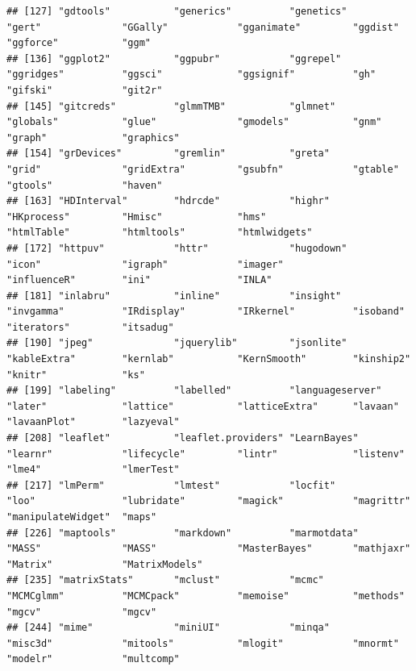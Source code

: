 \documentclass[
  12pt,
]{book}
\begin{document}
\begin{verbatim}
## [127] "gdtools"           "generics"          "genetics"          "gert"              "GGally"            "gganimate"         "ggdist"            "ggforce"           "ggm"              
## [136] "ggplot2"           "ggpubr"            "ggrepel"           "ggridges"          "ggsci"             "ggsignif"          "gh"                "gifski"            "git2r"            
## [145] "gitcreds"          "glmmTMB"           "glmnet"            "globals"           "glue"              "gmodels"           "gnm"               "graph"             "graphics"         
## [154] "grDevices"         "gremlin"           "greta"             "grid"              "gridExtra"         "gsubfn"            "gtable"            "gtools"            "haven"            
## [163] "HDInterval"        "hdrcde"            "highr"             "HKprocess"         "Hmisc"             "hms"               "htmlTable"         "htmltools"         "htmlwidgets"      
## [172] "httpuv"            "httr"              "hugodown"          "icon"              "igraph"            "imager"            "influenceR"        "ini"               "INLA"             
## [181] "inlabru"           "inline"            "insight"           "invgamma"          "IRdisplay"         "IRkernel"          "isoband"           "iterators"         "itsadug"          
## [190] "jpeg"              "jquerylib"         "jsonlite"          "kableExtra"        "kernlab"           "KernSmooth"        "kinship2"          "knitr"             "ks"               
## [199] "labeling"          "labelled"          "languageserver"    "later"             "lattice"           "latticeExtra"      "lavaan"            "lavaanPlot"        "lazyeval"         
## [208] "leaflet"           "leaflet.providers" "LearnBayes"        "learnr"            "lifecycle"         "lintr"             "listenv"           "lme4"              "lmerTest"         
## [217] "lmPerm"            "lmtest"            "locfit"            "loo"               "lubridate"         "magick"            "magrittr"          "manipulateWidget"  "maps"             
## [226] "maptools"          "markdown"          "marmotdata"        "MASS"              "MASS"              "MasterBayes"       "mathjaxr"          "Matrix"            "MatrixModels"     
## [235] "matrixStats"       "mclust"            "mcmc"              "MCMCglmm"          "MCMCpack"          "memoise"           "methods"           "mgcv"              "mgcv"             
## [244] "mime"              "miniUI"            "minqa"             "misc3d"            "mitools"           "mlogit"            "mnormt"            "modelr"            "multcomp"         

\end{verbatim}
\end{document}
